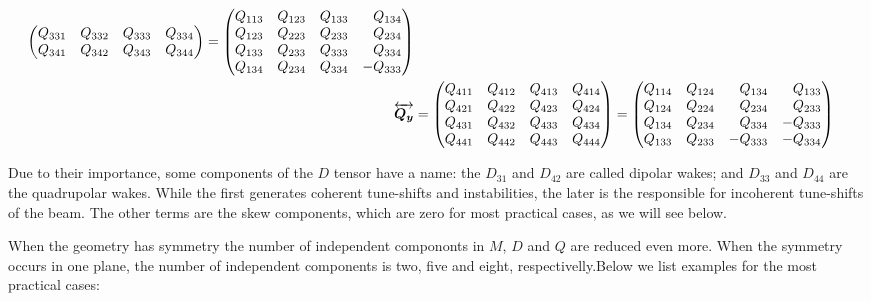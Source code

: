 \documentclass[
	12pt,				%
	openright,			%
	oneside,			%
	a4paper,		%
	chapter=TITLE,		%
	section=TITLE,		%
    brazil,				%
	english,			%
	sumario=tradicional,
	]{abntex2}
\begin{document}
\begin{apendicesenv}
\begin{align}
\begin{pmatrix*}[r]
                                   Q_{331} & Q_{332} & Q_{333} & Q_{334} \\
                                   Q_{341} & Q_{342} & Q_{343} & Q_{344}
               \end{pmatrix*} =
               \begin{pmatrix*}[r] Q_{113} & Q_{123} & Q_{133} & Q_{134} \\
                                   Q_{123} & Q_{223} & Q_{233} & Q_{234} \\
                                   Q_{133} & Q_{233} & Q_{333} & Q_{334} \\
                                   Q_{134} & Q_{234} & Q_{334} & -Q_{333}
               \end{pmatrix*}\\
\tensor{Q_y}&= \begin{pmatrix*}[r] Q_{411} & Q_{412} & Q_{413} & Q_{414} \\
                                   Q_{421} & Q_{422} & Q_{423} & Q_{424} \\
                                   Q_{431} & Q_{432} & Q_{433} & Q_{434} \\
                                   Q_{441} & Q_{442} & Q_{443} & Q_{444}
               \end{pmatrix*} =
               \begin{pmatrix*}[r] Q_{114} & Q_{124} & Q_{134} & Q_{133} \\
                                   Q_{124} & Q_{224} & Q_{234} & Q_{233} \\
                                   Q_{134} & Q_{234} & Q_{334} & -Q_{333} \\
                                   Q_{133} & Q_{233} &-Q_{333} & -Q_{334}
               \end{pmatrix*}\\
\end{align}



Due to their importance, some components of the $D$ tensor have a name: the $D_{31}$ and $D_{42}$ are called dipolar wakes; and $D_{33}$ and $D_{44}$ are the quadrupolar wakes. While the first generates coherent tune-shifts and instabilities, the later is the responsible for incoherent tune-shifts of the beam. The other terms are the skew components, which are zero for most practical cases, as we will see below.

When the geometry has symmetry the number of independent compononts in $M$, $D$ and $Q$ are reduced even more.
When the symmetry occurs in one plane, the number of independent components is two, five and eight, respectivelly.Below we list examples for the most practical cases:


\end{apendicesenv}
\end{document}
